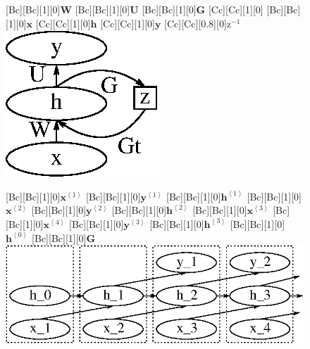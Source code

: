 \documentclass{now}
\newcommand{\qt}[1]{\left<#1\right>}
\newcommand{\vect}[1]{\mathbf{#1}}
\newcommand{\matr}[1]{\mathbf{#1}}
\newcommand{\vh}[0]{\vect{h}}
\newcommand{\vx}[0]{\vect{x}}
\newcommand{\vy}[0]{\vect{y}}
\newcommand{\mW}[0]{\matr{W}}
\newcommand{\mG}[0]{\matr{G}}
\newcommand{\mU}[0]{\matr{U}}
\begin{document}
\begin{figure}[t]
    \begin{minipage}{0.40\textwidth}
        \centering
        [Bc][Bc][1][0]{$\mW$}
        [Bc][Bc][1][0]{$\mU$}
        [Bc][Bc][1][0]{$\mG$}
        [Cc][Cc][1][0]{}
        [Bc][Bc][1][0]{$\vx$}
        [Cc][Cc][1][0]{$\vh$}
        [Cc][Cc][1][0]{$\vy$}
        [Cc][Cc][0.8][0]{$\text{z}^{-1}$}
        \includegraphics[width=0.65\columnwidth]{../figures/rnn.eps}
    \end{minipage}
    \begin{minipage}{0.58\textwidth}
        \centering
        [Bc][Bc][1][0]{$\vx^{\qt{1}}$}
        [Bc][Bc][1][0]{$\vy^{\qt{1}}$}
        [Bc][Bc][1][0]{$\vh^{\qt{1}}$}
        [Bc][Bc][1][0]{$\vx^{\qt{2}}$}
        [Bc][Bc][1][0]{$\vy^{\qt{2}}$}
        [Bc][Bc][1][0]{$\vh^{\qt{2}}$}
        [Bc][Bc][1][0]{$\vx^{\qt{3}}$}
        [Bc][Bc][1][0]{$\vx^{\qt{4}}$}
        [Bc][Bc][1][0]{$\vy^{\qt{3}}$}
        [Bc][Bc][1][0]{$\vh^{\qt{3}}$}
        [Bc][Bc][1][0]{$\vh^{\qt{0}}$}
        [Bc][Bc][1][0]{$\mG$}
        \includegraphics[width=\columnwidth]{../figures/rnn_tf.eps}
    \end{minipage}


\end{figure}
\end{document}
